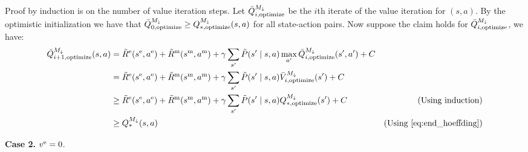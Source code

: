     Proof by induction is on the number of value iteration steps. Let $\bar{Q}^{{M}_{\downarrow}}_{i, \text{optimize}}$ be the $i$th iterate of the value iteration for $(s, a)$. By the optimistic initialization we have that $\bar{Q}^{{M}_{\downarrow}}_{0, \text{optimize}} \geq Q^{M_{\downarrow}}_{*, \text{optimize}}(s, a)$ for all state-action pairs. Now suppose the claim holds for $\bar{Q}^{{M}_{\downarrow}}_{i, \text{optimize}}$, we have:
\begin{align*}
        \model{Q}^{{M}_{\downarrow}}_{i + 1, \text{optimize}}(s, a) & = \env{\estimate{R}}(\env{s}, \env{a}) + \mon{\estimate{R}}(\mon{s}, \mon{a}) + \gamma\sum_{s'}\estimate{P}(s' \mid s, a)\max_{a'}\model{Q}^{{M}_{\downarrow}}_{i, \text{optimize}}(s', a') + C \\
        & = \env{\estimate{R}}(\env{s}, \env{a}) + \mon{\estimate{R}}(\mon{s}, \mon{a}) + \gamma\sum_{s'}\estimate{P}(s' \mid s, a)\model{V}^{{M}_{\downarrow}}_{i, \text{optimize}}(s') + C \\
        & \geq \env{\estimate{R}}(\env{s}, \env{a}) + \mon{\estimate{R}}(\mon{s}, \mon{a}) + \gamma\sum_{s'}\estimate{P}(s' \mid s, a)Q^{{M}_{\downarrow}}_{*, \text{optimize}}(s') + C & \text{(Using induction)} \\
        & \geq Q^{M_{\downarrow}}_{*}(s, a) & \text{(Using \cref{eq:end_hoeffding})}
\end{align*} 
%
%
%

\textbf{Case 2.} $v^\text{e} = 0$.

